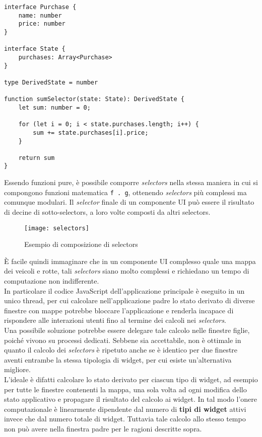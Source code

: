 \begin{lstlisting}
interface Purchase {
    name: number
    price: number
}

interface State {
    purchases: Array<Purchase>
}

type DerivedState = number

function sumSelector(state: State): DerivedState {
    let sum: number = 0;

    for (let i = 0; i < state.purchases.length; i++) {
        sum += state.purchases[i].price;
    }

    return sum
}
\end{lstlisting}

Essendo funzioni pure, è possibile comporre \textit{selectors} nella stessa maniera in cui si compongono funzioni matematica \texttt{f . g}, ottenendo \textit{selectors} più complessi ma comunque modulari. Il \textit{selector} finale di un componente UI può essere il risultato di decine di sotto-selectors, a loro volte composti da altri selectors.

\begin{figure}[H] 
  \centering 
  \texttt{[image: selectors]} 
  \caption{Esempio di composizione di selectors}
\end{figure}

È facile quindi immaginare che in un componente UI complesso quale una mappa dei veicoli e rotte, tali \textit{selectors} siano molto complessi e richiedano un tempo di computazione non indifferente. \\

In particolare il codice JavaScript dell'applicazione principale è eseguito in un unico thread, per cui calcolare nell'applicazione padre lo stato derivato di diverse finestre con mappe potrebbe bloccare l'applicazione e renderla incapace di rispondere alle interazioni utenti fino al termine dei calcoli nei \textit{selectors}. \\

Una possibile soluzione potrebbe essere delegare tale calcolo nelle finestre figlie, poiché vivono su processi dedicati. Sebbene sia accettabile, non è ottimale in quanto il calcolo dei \textit{selectors} è ripetuto anche se è identico per due finestre aventi entrambe la stessa tipologia di widget, per cui esiste un'alternativa migliore. \\

L'ideale è difatti calcolare lo stato derivato per ciascun tipo di widget, ad esempio per tutte le finestre contenenti la mappa, una sola volta ad ogni modifica dello stato applicativo e propagare il risultato del calcolo ai widget. In tal modo l'onere computazionale è linearmente dipendente dal numero di \textbf{tipi di widget} attivi invece che dal numero totale di widget. Tuttavia tale calcolo allo stesso tempo non può avere nella finestra padre per le ragioni descritte sopra.

